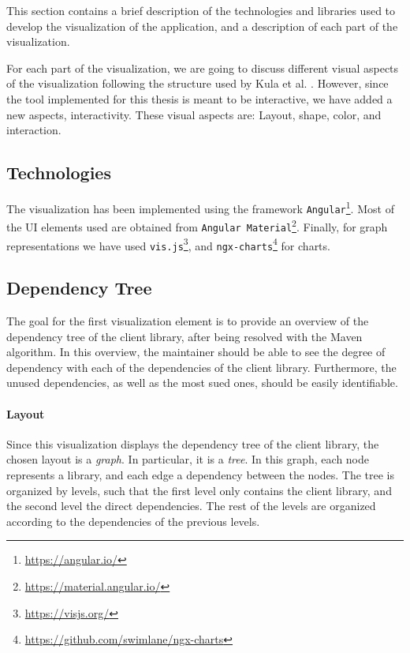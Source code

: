 This section contains a brief description of the technologies and libraries used to develop the visualization of the application, and a description of each part of the visualization.

For each part of the visualization, we are going to discuss different visual aspects of the visualization following the structure used by Kula et al. \cite{kula2014visualizing}. However, since the tool implemented for this thesis is meant to be interactive, we have added a new aspects, interactivity. These visual aspects are: Layout, shape, color, and interaction.

\subsection{Technologies}
The visualization has been implemented using the framework \texttt{Angular}\footnote{\url{https://angular.io/}}. Most of the UI elements used are obtained from \texttt{Angular Material}\footnote{\url{https://material.angular.io/}}. Finally, for graph representations we have used \texttt{vis.js}\footnote{\url{https://visjs.org/}}, and \texttt{ngx-charts}\footnote{\url{https://github.com/swimlane/ngx-charts}} for charts.

\subsection{Dependency Tree}\label{sec:visualization-dependency-tree}
The goal for the first visualization element is to provide an overview of the dependency tree of the client library, after being resolved with the Maven algorithm. In this overview, the maintainer should be able to see the degree of dependency with each of the dependencies of the client library. Furthermore, the unused dependencies, as well as the most sued ones, should be easily identifiable.

\paragraph{Layout}
Since this visualization displays the dependency tree of the client library, the chosen layout is a \textit{graph}. In particular, it is a \textit{tree}. In this graph, each node represents a library, and each edge a dependency between the nodes. The tree is organized by levels, such that the first level only contains the client library, and the second level the direct dependencies. The rest of the levels are organized according to the dependencies of the previous levels.

